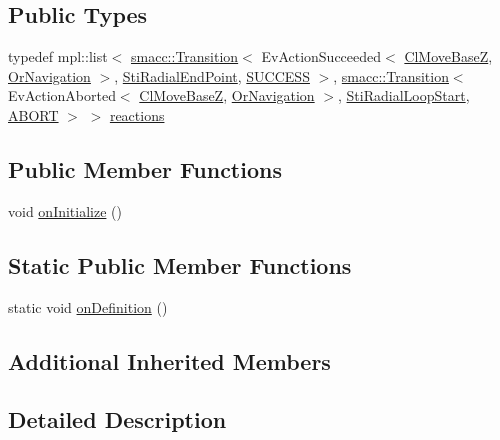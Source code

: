 \subsection*{Public Types}
\begin{DoxyCompactItemize}
\item 
typedef mpl\+::list$<$ \hyperlink{classsmacc_1_1Transition}{smacc\+::\+Transition}$<$ Ev\+Action\+Succeeded$<$ \hyperlink{classmove__base__z__client_1_1ClMoveBaseZ}{Cl\+Move\+BaseZ}, \hyperlink{classsm__dance__bot_1_1OrNavigation}{Or\+Navigation} $>$, \hyperlink{structsm__dance__bot_1_1radial__motion__states_1_1StiRadialEndPoint}{Sti\+Radial\+End\+Point}, \hyperlink{classSUCCESS}{S\+U\+C\+C\+E\+SS} $>$, \hyperlink{classsmacc_1_1Transition}{smacc\+::\+Transition}$<$ Ev\+Action\+Aborted$<$ \hyperlink{classmove__base__z__client_1_1ClMoveBaseZ}{Cl\+Move\+BaseZ}, \hyperlink{classsm__dance__bot_1_1OrNavigation}{Or\+Navigation} $>$, \hyperlink{structsm__dance__bot_1_1radial__motion__states_1_1StiRadialLoopStart}{Sti\+Radial\+Loop\+Start}, \hyperlink{classABORT}{A\+B\+O\+RT} $>$ $>$ \hyperlink{structsm__dance__bot_1_1radial__motion__states_1_1StiRadialRotate_adde09fb74a52552c835a648b11fa3ff7}{reactions}
\end{DoxyCompactItemize}
\subsection*{Public Member Functions}
\begin{DoxyCompactItemize}
\item 
void \hyperlink{structsm__dance__bot_1_1radial__motion__states_1_1StiRadialRotate_a9f0a091c47fc745743e88e146134337b}{on\+Initialize} ()
\end{DoxyCompactItemize}
\subsection*{Static Public Member Functions}
\begin{DoxyCompactItemize}
\item 
static void \hyperlink{structsm__dance__bot_1_1radial__motion__states_1_1StiRadialRotate_a10084bffd50c9ac054b07b554a9c0193}{on\+Definition} ()
\end{DoxyCompactItemize}
\subsection*{Additional Inherited Members}


\subsection{Detailed Description}


